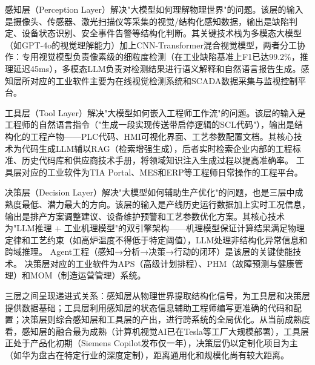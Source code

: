 \documentclass[12pt,a4paper]{ctexart}
\begin{document}
感知层（Perception Layer）解决"大模型如何理解物理世界"的问题。该层的输入是摄像头、传感器、激光扫描仪等采集的视觉/结构化感知数据，输出是缺陷判定、设备状态识别、安全事件告警等结构化判断。其关键技术栈为多模态大模型（如GPT-4o的视觉理解能力）加上CNN-Transformer混合视觉模型，两者分工协作：专用视觉模型负责像素级的细粒度检测（在工业缺陷基准上F1已达99.2\%，推理延迟45ms）\cite{jisem2025cvzerodefect}，多模态LLM负责对检测结果进行语义解释和自然语言报告生成。感知层所对应的工业软件主要为在线视觉检测系统和SCADA数据采集与监视控制平台。

工具层（Tool Layer）解决"大模型如何嵌入工程师工作流"的问题。该层的输入是工程师的自然语言指令（"生成一段实现传送带启停逻辑的SCL代码"），输出是结构化的工程产物——PLC代码、HMI可视化界面、工艺参数配置文档。其核心技术为代码生成LLM辅以RAG（检索增强生成），后者实时检索企业内部的工程标准、历史代码库和供应商技术手册，将领域知识注入生成过程以提高准确率。\cite{jms2025ifm} 工具层对应的工业软件为TIA Portal、MES和ERP等工程师日常操作的工程平台。

决策层（Decision Layer）解决"大模型如何辅助生产优化"的问题，也是三层中成熟度最低、潜力最大的方向。该层的输入是产线历史运行数据加上实时工况信息，输出是排产方案调整建议、设备维护预警和工艺参数优化方案。其核心技术为"LLM推理 + 工业机理模型"的双引擎架构——机理模型保证计算结果满足物理定律和工艺约束（如高炉温度不得低于特定阈值），LLM处理非结构化异常信息和跨域推理。\cite{jiic2025cdtllm} Agent工程（感知→分析→决策→行动的闭环）是该层的关键使能技术。\cite{jms2025ifm} 决策层对应的工业软件为APS（高级计划排程）、PHM（故障预测与健康管理）和MOM（制造运营管理）系统。

三层之间呈现递进式关系：感知层从物理世界提取结构化信号，为工具层和决策层提供数据基础；工具层利用感知层的状态信息辅助工程师编写更准确的代码和配置；决策层则综合感知层和工具层的产出，进行跨系统的全局优化。从当前成熟度看，感知层的融合最为成熟（计算机视觉AI已在Tesla等工厂大规模部署），工具层正处于产品化初期（Siemens Copilot发布仅一年），决策层仍以定制化项目为主（如华为盘古在特定行业的深度定制），距离通用化和规模化尚有较大距离。
\end{document}
